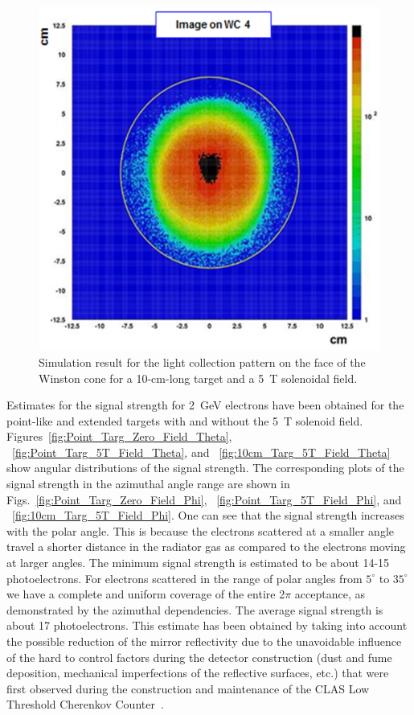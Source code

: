 \begin{figure}[!ht]
    \centering
    \includegraphics[width=1.0\linewidth,trim={0.0cm 0.0cm 0.0cm 0.0cm},clip]{images/10cm_Targ_5T_Field_WCone.png}
    \caption{Simulation result for the light collection pattern on the face of the Winston cone for a 10-cm-long target
      and a 5~T solenoidal field.}
    \label{fig:10cm_Targ_5T_Field_WCone}
\end{figure}

Estimates for the signal strength for 2~GeV electrons have been obtained for the point-like and extended targets
with and without the 5~T solenoid field. Figures~\ref{fig:Point_Targ_Zero_Field_Theta}, 
~\ref{fig:Point_Targ_5T_Field_Theta}, and ~\ref{fig:10cm_Targ_5T_Field_Theta} show angular distributions of
the signal strength. The corresponding plots of the signal strength in the azimuthal angle range are shown in
Figs.~\ref{fig:Point_Targ_Zero_Field_Phi}, ~\ref{fig:Point_Targ_5T_Field_Phi}, and 
~\ref{fig:10cm_Targ_5T_Field_Phi}. One can see that the signal strength increases with the polar angle. This
is because the electrons scattered at a smaller angle travel a shorter distance in the radiator gas as compared to
the electrons moving at larger angles. The minimum signal strength is estimated to be about 14-15 photoelectrons.
For electrons scattered in the range of polar angles from $5^\circ$ to $35^\circ$ we have a complete and uniform
coverage of the entire 2$\pi$ acceptance, as demonstrated by the azimuthal dependencies. The average signal
strength is about 17 photoelectrons. This estimate has been obtained by taking into account the possible reduction of
the mirror reflectivity due to the unavoidable influence of the hard to control factors during the detector construction
(dust and fume deposition, mechanical imperfections of the reflective surfaces, etc.) that were first observed during
the construction and maintenance of the CLAS Low Threshold Cherenkov Counter~\cite{Adams:2001kk}.

